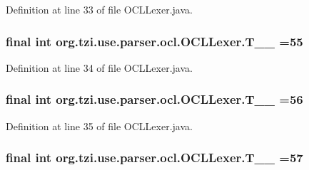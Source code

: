 Definition at line 33 of file O\-C\-L\-Lexer.\-java.

\hypertarget{classorg_1_1tzi_1_1use_1_1parser_1_1ocl_1_1_o_c_l_lexer_a50fefe8400e00d9c3d39a78acb05717d}{
\subsubsection[{T\-\_\-\-\_\-55}]{\setlength{\rightskip}{0pt plus 5cm}final int org.\-tzi.\-use.\-parser.\-ocl.\-O\-C\-L\-Lexer.\-T\-\_\-\-\_ =55\hspace{0.3cm}{\ttfamily [static]}}}\label{classorg_1_1tzi_1_1use_1_1parser_1_1ocl_1_1_o_c_l_lexer_a50fefe8400e00d9c3d39a78acb05717d}


Definition at line 34 of file O\-C\-L\-Lexer.\-java.

\hypertarget{classorg_1_1tzi_1_1use_1_1parser_1_1ocl_1_1_o_c_l_lexer_a0dd0dc0c75af5739c183ae1b934ed8b3}{
\subsubsection[{T\-\_\-\-\_\-56}]{\setlength{\rightskip}{0pt plus 5cm}final int org.\-tzi.\-use.\-parser.\-ocl.\-O\-C\-L\-Lexer.\-T\-\_\-\-\_ =56\hspace{0.3cm}{\ttfamily [static]}}}\label{classorg_1_1tzi_1_1use_1_1parser_1_1ocl_1_1_o_c_l_lexer_a0dd0dc0c75af5739c183ae1b934ed8b3}


Definition at line 35 of file O\-C\-L\-Lexer.\-java.

\hypertarget{classorg_1_1tzi_1_1use_1_1parser_1_1ocl_1_1_o_c_l_lexer_a20a00c1006aa9f84c557648b72cac691}{
\subsubsection[{T\-\_\-\-\_\-57}]{\setlength{\rightskip}{0pt plus 5cm}final int org.\-tzi.\-use.\-parser.\-ocl.\-O\-C\-L\-Lexer.\-T\-\_\-\-\_ =57\hspace{0.3cm}{\ttfamily [static]}}}\label{classorg_1_1tzi_1_1use_1_1parser_1_1ocl_1_1_o_c_l_lexer_a20a00c1006aa9f84c557648b72cac691}


